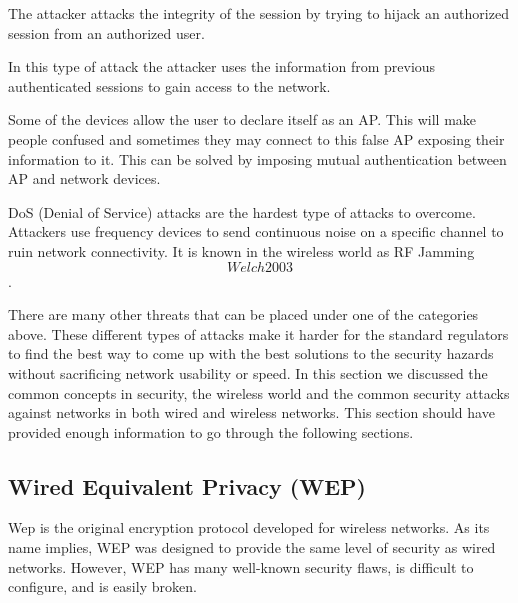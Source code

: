 \documentclass[a4paper,12pt,pagesize,headsepline,bibtotoc,titlepage]{scrartcl}
\begin{document}
The attacker attacks the integrity of the session by trying to hijack an authorized session from an authorized user.


In this type of attack the attacker uses the information from previous authenticated sessions to gain access to the network.


Some of the devices allow the user to declare itself as an AP. This will make people confused and sometimes they may connect to this false AP exposing their information to it. This can be solved by imposing mutual authentication between AP and network devices.


DoS (Denial of Service) attacks are the hardest type of attacks to overcome. Attackers use frequency devices to send continuous noise on a specific channel to ruin network connectivity. It is known in the wireless world as RF Jamming \[Welch2003\].

There are many other threats that can be placed under one of the categories above. These different types of attacks make it harder for the standard regulators to find the best way to come up with the best solutions to the security hazards without sacrificing network usability or speed. In this section we discussed the common concepts in security, the wireless world and the common security attacks against networks in both wired and wireless networks. This section should have provided enough information to go through the following sections.

\subsection{Wired Equivalent Privacy (WEP)}
Wep is the original encryption protocol developed for wireless networks. As its name implies, WEP was designed to provide the same level of security as wired networks. However, WEP has many well-known security flaws, is difficult to configure, and is easily broken.
\end{document}

